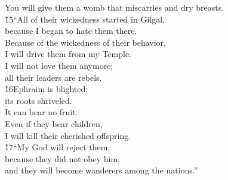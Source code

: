 \begin{poetry}
\poemlll       You will give them a womb that miscarries and dry breasts. \\
\poeml \v{15}``All of their wickedness started in Gilgal, \\
\poemll    because I began to hate them there. \\
\poeml Because of the wickedness of their behavior, \\
\poemll    I will drive them from my Temple. \\
\poeml I will not love them anymore; \\
\poemll    all their leaders are rebels. \\
\poeml \v{16}Ephraim is blighted; \\
\poemll    its roots shriveled. \\
\poemlll       It can bear no fruit. \\
\poeml Even if they bear children, \\
\poemll    I will kill their cherished offspring. \\
\poeml \v{17}``My God will reject them, \\
\poemll    because they did not obey him, \\
\poemlll       and they will become wanderers among the nations.''
\end{poetry}

